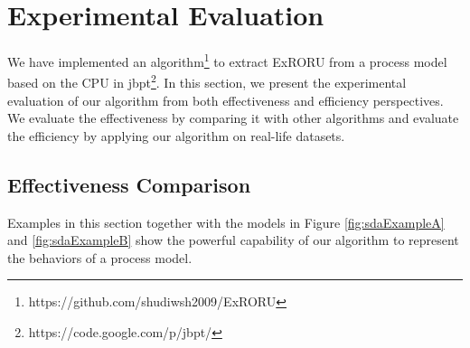 \documentclass[dvips,...]{llncs}
\begin{document}

\section{Experimental Evaluation}\label{sec:experiments}
We have implemented an algorithm\footnote{https://github.com/shudiwsh2009/ExRORU} to extract ExRORU from a process model based on the CPU in jbpt\footnote{https://code.google.com/p/jbpt/}. In this section, we present the experimental evaluation of our algorithm from both effectiveness and efficiency perspectives. We evaluate the effectiveness by comparing it with other algorithms and evaluate the efficiency by applying our algorithm on real-life datasets.

\subsection{Effectiveness Comparison}\label{subsec:effectiveness}
Examples in this section together with the models in Figure \ref{fig:sdaExampleA} and \ref{fig:sdaExampleB} show the powerful capability of our algorithm to represent the behaviors of a process model.
\end{document}
